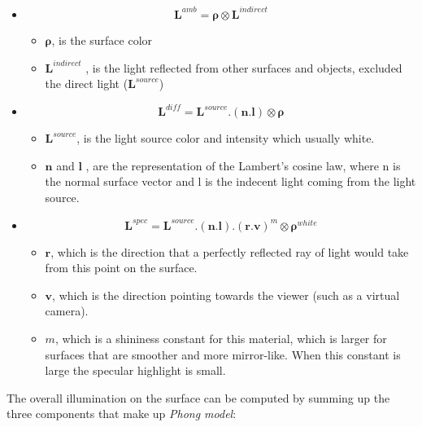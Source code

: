 \documentclass{article}
\begin{document}
	\begin{itemize}
		\item {}
		\begin{equation}
			\pmb{L}^{amb} = \pmb{\rho}\otimes \pmb{L}^{indirect}
		\end{equation}
		
		\begin{itemize}
			\item $\pmb{\rho}$, is the surface color
			\item $\pmb{L}^{indirect}$ , is the light reflected from other surfaces and objects, excluded the direct light ($\pmb{L}^{source}$)
		\end{itemize}
		\item {} 
		
		\begin{equation}
			\pmb{L}^{diff} =  \pmb{L}^{source}.(\pmb{n}.\pmb{l}) \otimes \pmb{\rho} 
		\end{equation}
		\begin{itemize}
			\item $\pmb{L}^{source}$, is the light source color and intensity which usually white. 
			\item $\pmb{n}$ and $\pmb{l}$ , are the representation of the Lambert's cosine law, where n is the normal surface vector  and l is the indecent light coming from the light source.
		\end{itemize}
		\item {} 
		
		\begin{equation}
			\pmb{L}^{spec} =  \pmb{L}^{source}.(\pmb{n}.\pmb{l}).(\pmb{r}.\pmb{v})^m \otimes \pmb{\rho}^{white} 
		\end{equation}
		\begin{itemize}
			\item $\pmb{r}$, which is the direction that a perfectly reflected ray of light would take from this point on the surface. 
			\item $\pmb{v}$, which is the direction pointing towards the viewer (such as a virtual camera).
			\item $m$, which is a shininess constant for this material, which is larger for surfaces that are smoother and more mirror-like. When this constant is large the specular highlight is small.
		\end{itemize}
	\end{itemize}
	
	The overall illumination on the surface can be computed by summing up the three components that make up \textit{Phong model}:
	
\end{document}
